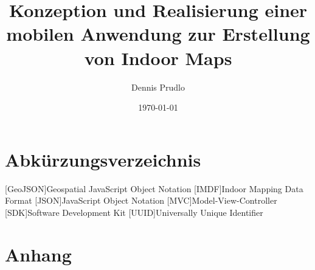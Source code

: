 \documentclass[a4paper, 12pt, twoside]{report}
\title{Konzeption und Realisierung einer mobilen Anwendung zur Erstellung von Indoor Maps}
\author{Dennis Prudlo}
\date{\today}
\newcounter{currentpage}
\begin{document}
	

	\pagestyle{plain}

	
	

	\tableofcontents
	\clearpage

	\listoffigures
	\clearpage

	\chapter*{Abkürzungsverzeichnis}
	\begin{acronym}
		[GeoJSON]{Geospatial JavaScript Object Notation}
		{Indoor Mapping Data Format}
		{JavaScript Object Notation}
		[MVC]{Model-View-Controller}
		[SDK]{Software Development Kit}
		{Universally Unique Identifier}
	\end{acronym}
	\clearpage


	\pagestyle{fancy}
	\setcounter{page}{\thecurrentpage}

	
	
	
	
	
	
	\clearpage

	\pagestyle{plain}
	\setcounter{page}{\thecurrentpage}

	\printbibliography
	\clearpage

	\printglossary
	\clearpage

	\chapter*{Anhang}
	\appendix
	
	\clearpage

\end{document}

